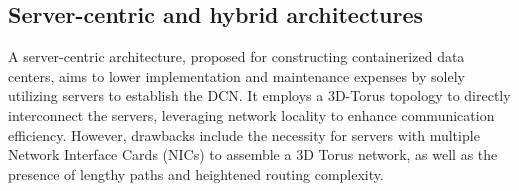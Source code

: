 \subsection{Server-centric and hybrid architectures}
A server-centric architecture, proposed for constructing containerized data centers, aims to lower implementation and maintenance expenses by solely utilizing servers to establish the DCN. 
It employs a 3D-Torus topology to directly interconnect the servers, leveraging network locality to enhance communication efficiency. 
However, drawbacks include the necessity for servers with multiple Network Interface Cards (NICs) to assemble a 3D Torus network, as well as the presence of lengthy paths and heightened routing complexity.